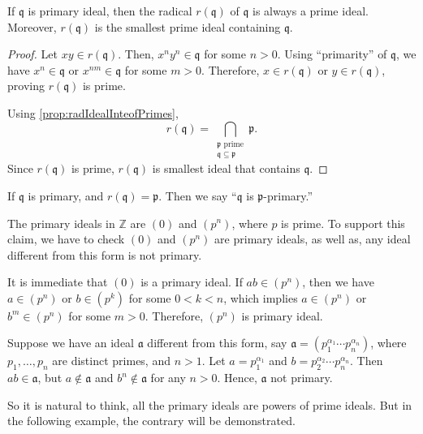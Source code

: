 \begin{proposition}
     If \( \mathfrak{q} \) is primary ideal, then the radical \( r(\mathfrak{q}) \) of \( \mathfrak{q} \) is always a prime ideal. Moreover, \( r(\mathfrak{q}) \) is the smallest prime ideal containing \( \mathfrak{q} \).
\end{proposition}
\begin{proof}
    Let \( xy \in r(\mathfrak{q}) \). Then, \( x^n y^n \in \mathfrak{q} \) for some \( n > 0 \). Using ``primarity'' of  \( \mathfrak{q} \), we have \( x^n \in \mathfrak{q} \) or \( x^{nm} \in \mathfrak{q}\) for some \( m > 0 \). Therefore, \( x \in r(\mathfrak{q}) \) or \( y \in r(\mathfrak{q}) \), proving \( r(\mathfrak{q}) \) is prime.

    Using \autoref{prop:radIdealInteofPrimes}, 
    \[
        r(\mathfrak{q}) = \bigcap_{\substack{\mathfrak{p} \text{ prime}\\ \mathfrak{q} \subseteq \mathfrak{p}}} \mathfrak{p}.
    \]
    Since \( r(\mathfrak{q}) \) is prime, \( r(\mathfrak{q}) \) is smallest ideal that contains  \( \mathfrak{q} \).
\end{proof}
If \( \mathfrak{q} \) is primary, and \( r(\mathfrak{q}) = \mathfrak{p}\). Then we say ``\( \mathfrak{q} \) is \( \mathfrak{p} \)-primary.''
\begin{example}\label{ex:PrimaryInZ}
    The primary ideals in \( \mathbb{Z} \) are \( (0) \) and  \( (p^n) \), where  \( p \) is prime. To support this claim, we have to check \( (0) \) and \( (p^n) \) are primary ideals, as well as, any ideal different from this form is not primary.

    It is immediate that \( (0) \) is a primary ideal. If  \( ab \in (p^n) \), then we have  \( a \in (p^n) \) or  \( b \in (p^k) \) for some \( 0 < k < n \), which implies  \( a \in (p^n) \) or  \( b^m \in (p^n) \) for some \( m > 0 \). Therefore, \( (p^n) \) is primary ideal.

    Suppose we have an ideal \( \mathfrak{a} \) different from this form, say  \( \mathfrak{a} = (p_1^{\alpha_1} \cdots p_n^{\alpha_n}) \), where \( p_1, \ldots, p_n \) are distinct primes, and \( n > 1 \). Let \( a = p_1^{\alpha_1}\) and \( b = p_2^{\alpha_2} \cdots p_n^{\alpha_n} \). Then \( ab \in \mathfrak{a}\), but \( a \not\in \mathfrak{a} \) and \( b^n \not\in \mathfrak{a} \) for any \( n > 0 \). Hence,  \( \mathfrak{a} \) not primary.
\end{example}
So it is natural to think, all the primary ideals are powers of prime ideals. But in the following example, the contrary will be demonstrated.

